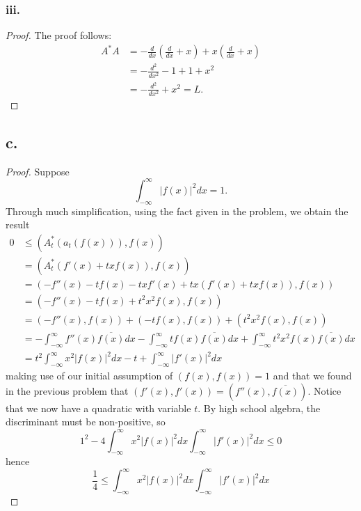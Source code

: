 \documentclass{article}
\begin{document}
\subsubsection*{iii.}
\begin{proof}
    The proof follows:
    \begin{align*}
        A^*A &= -\frac{d}{dx}\left(\frac{d}{dx} + x\right) + x\left(\frac{d}{dx} + x \right) \\
        &= -\frac{d^2}{dx^2} - 1 + 1 + x^2 \\
        &= -\frac{d^2}{dx^2} + x^2 = L.
    \end{align*}
\end{proof}
\subsection*{c.}
\begin{proof}
    Suppose 
    \[
    \int_{-\infty}^{\infty}|f(x)|^2dx = 1.    
    \]
    Through much simplification, using the fact given in the problem, we obtain the result 
    \begin{align*}
        0 &\leq (A_t^*(a_t(f(x))), f(x)) \\
        &= (A_t^*(f'(x) + txf(x)), f(x)) \\
        &= (-f''(x) - tf(x) -txf'(x) + tx(f'(x)+txf(x)), f(x)) \\
        &= (-f''(x) -tf(x) + t^2x^2f(x), f(x)) \\
        &= (-f''(x), f(x)) + (-tf(x), f(x)) + (t^2x^2f(x), f(x)) \\
        &= -\int_{-\infty}^{\infty}f''(x)\overline{f(x)}dx - \int_{-\infty}^{\infty}tf(x)\overline{f(x)}dx + \int_{-\infty}^{\infty}t^2x^2f(x)\overline{f(x)}dx \\
        &= t^2\int_{-\infty}^{\infty}x^2|f(x)|^2dx - t + \int_{-\infty}^{\infty}|f'(x)|^2dx
    \end{align*}
    making use of our initial assumption of $(f(x), f(x)) = 1$ and that we found in the previous problem that $(f'(x), f'(x)) = (f''(x), \overline{f(x)})$. Notice that we now have a quadratic with variable $t$. By high school algebra, the discriminant must be non-positive, so 
    \[
    1^2 - 4\int_{-\infty}^{\infty}x^2|f(x)|^2dx\int_{-\infty}^{\infty}|f'(x)|^2dx \leq 0    
    \]
    hence 
    \[
    \frac{1}{4}\leq\int_{-\infty}^{\infty}x^2|f(x)|^2dx\int_{-\infty}^{\infty}|f'(x)|^2dx    
    \]
\end{proof}
\end{document}
